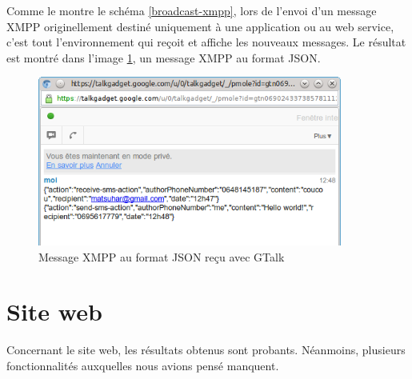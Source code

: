 Comme le montre le schéma \ref{broadcast-xmpp}, lors de l'envoi d'un message XMPP originellement destiné uniquement à une application ou au web service, c'est tout l'environnement qui reçoit et affiche les nouveaux messages.
Le résultat est montré dans l'image \ref{message-xmpp-json-gmail}, un message XMPP au format JSON. 
	
\begin{figure}[!h]
	\center
	\includegraphics[width=10cm]{img/message-xmpp-json-gmail.png}
	\caption{Message XMPP au format JSON reçu avec GTalk}
	\label{message-xmpp-json-gmail}
\end{figure}






\section{Site web}

Concernant le site web, les résultats obtenus sont probants.
Néanmoins, plusieurs fonctionnalités auxquelles nous avions pensé manquent.




